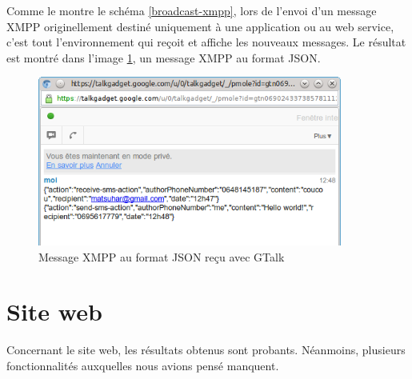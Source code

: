 Comme le montre le schéma \ref{broadcast-xmpp}, lors de l'envoi d'un message XMPP originellement destiné uniquement à une application ou au web service, c'est tout l'environnement qui reçoit et affiche les nouveaux messages.
Le résultat est montré dans l'image \ref{message-xmpp-json-gmail}, un message XMPP au format JSON. 
	
\begin{figure}[!h]
	\center
	\includegraphics[width=10cm]{img/message-xmpp-json-gmail.png}
	\caption{Message XMPP au format JSON reçu avec GTalk}
	\label{message-xmpp-json-gmail}
\end{figure}






\section{Site web}

Concernant le site web, les résultats obtenus sont probants.
Néanmoins, plusieurs fonctionnalités auxquelles nous avions pensé manquent.




